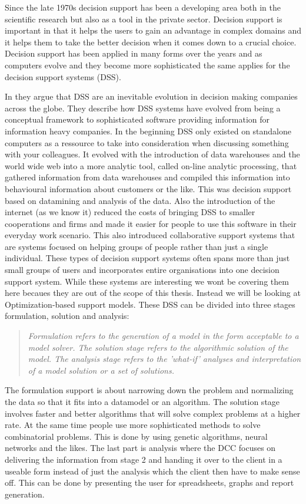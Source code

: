 Since the late 1970s decision support has been a developing area both in the scientific research but also as a tool in the private sector. Decision support is important in that it helps the users to gain an advantage in complex domains and it helps them to take the better decision when it comes down to a crucial choice. Decision support has been applied in many forms over the years and as computers evolve and they become more sophisticated the same applies for the decision support systems (DSS).

In \cite{shim2002past} they argue that DSS are an inevitable evolution in decision making companies across the globe. They describe how DSS systems have evolved from being a conceptual framework to sophisticated software providing information for information heavy companies. In the beginning DSS only existed on standalone computers as a ressource to take into consideration when discussing something with your colleagues. It evolved with the introduction of data warehouses and the world wide web into a more analytic tool, called on-line analytic processing, that gathered information from data warehouses and compiled this information into behavioural information about customers or the like. This was decision support based on datamining and analysis of the data. Also the introduction of the internet (as we know it) reduced the costs of bringing DSS to smaller cooperations and firms and made it easier for people to use this software in their everyday work scenario. This also introduced collaborative support systems that are systems focused on helping groups of people rather than just a single individual. These types of decision support systems often spans more than just small groups of users and incorporates entire organisations into one decision support system. While these systems are interesting we wont be covering them here becaues they are out of the scope of this thesis. Instead we will be looking at Optimization-based support models. These DSS can be divided into three stages formulation, solution and analysis\cite{shim2002past}:
\begin{quotation}
\textit{Formulation refers to the generation of a model in the form acceptable to a model solver. The solution stage refers to the algorithmic solution of the model. The analysis stage refers to the 'what-if' analyses and interpretation of a model solution or a set of solutions.}
\end{quotation}
The formulation support is about narrowing down the problem and normalizing the data so that it fits into a datamodel or an algorithm. The solution stage involves faster and better algorithms that will solve complex problems at a higher rate. At the same time people use more sophisticated methods to solve combinatorial problems. This is done by using genetic algorithms, neural networks and the likes\cite{shim2002past}. The last part is analysis where the DCC focuses on delivering the information from stage 2 and handing it over to the client in a useable form instead of just the analysis which the client then have to make sense off. This can be done by presenting the user for spreadsheets, graphs and report generation.

